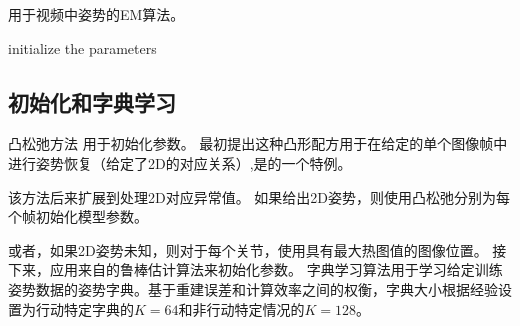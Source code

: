 \begin{algorithm}[t]
\LinesNumbered
\caption{用于视频中姿势的EM算法。}\label{alg:em}
\vspace{0.3em}
\vspace{0.3em}
initialize the parameters 
\vspace{0.5em}
\end{algorithm}
 
\subsection{初始化和字典学习}\label{sec:initialization}

凸松弛方法 \cite{zhou20153d,zhou2015sparse}用于初始化参数。
最初提出这种凸形配方用于在给定的单个图像帧中进行姿势恢复\cite{zhou20153d}（给定了2D的对应关系）,是的一个特例。

该方法后来扩展到处理2D对应异常值\cite{zhou2015sparse}。 如果给出2D姿势，则使用凸松弛分别为每个帧初始化模型参数\cite{zhou2015sparse}。

或者，如果2D姿势未知，则对于每个关节，使用具有最大热图值的图像位置。
接下来，应用来自\cite{zhou2015sparse}的鲁棒估计算法来初始化参数。
字典学习算法\cite{zhou2015sparse}用于学习给定训练姿势数据的姿势字典。基于重建误差和计算效率之间的权衡，字典大小根据经验设置为行动特定字典的$K=64$和非行动特定情况的$K=128$。